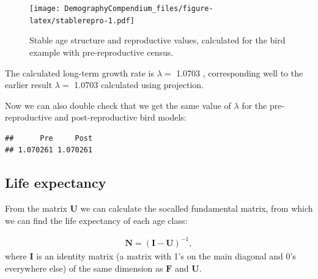 \documentclass[
]{book}
\newenvironment{Shaded}{\begin{snugshade}}{\end{snugshade}}
\newcommand{\FunctionTok}[1]{\textcolor[rgb]{0.00,0.00,0.00}{#1}}
\newcommand{\NormalTok}[1]{#1}
\newcommand{\OtherTok}[1]{\textcolor[rgb]{0.56,0.35,0.01}{#1}}
\newcommand{\SpecialCharTok}[1]{\textcolor[rgb]{0.00,0.00,0.00}{#1}}
\newcommand{\StringTok}[1]{\textcolor[rgb]{0.31,0.60,0.02}{#1}}
\begin{document}
\begin{figure}
\centering
\texttt{[image: DemographyCompendium\_files/figure-latex/stablerepro-1.pdf]}
\caption{\label{fig:stablerepro}Stable age structure and reproductive values, calculated for the bird example with pre-reproductive census.}
\end{figure}

The calculated long-term growth rate is \(\lambda=\) 1.0703 , corresponding well to the earlier result \(\lambda=\) 1.0703 calculated using projection.

Now we can also double check that we get the same value of \(\lambda\) for the pre-reproductive and post-reproductive bird models:

\begin{Shaded}
\end{Shaded}

\begin{verbatim}
##      Pre     Post 
## 1.070261 1.070261
\end{verbatim}

\hypertarget{lifetime}{%
\subsection{Life expectancy}\label{lifetime}}

From the matrix \(\mathbf{U}\) we can calculate the socalled fundamental matrix, from which we can find the life expectancy of each age class:

\begin{align}
\mathbf{N}=(\mathbf{I}-\mathbf{U})^{-1},
\label{eq:Fundamental}
\end{align}
where \(\mathbf{I}\) is an identity matrix (a matrix with 1's on the main diagonal and 0's everywhere else) of the same dimension as \(\mathbf{F}\) and \(\mathbf{U}\).
\end{document}
